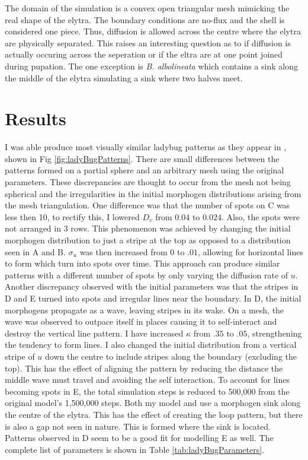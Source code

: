 The domain of the simulation is a convex open triangular mesh mimicking the real shape of the elytra. The boundary conditions are no-flux and the shell is considered one piece. Thus, diffusion is allowed across the centre where the elytra are physically separated. This raises an interesting question as to if diffusion is actually occuring across the seperation or if the eltra are at one point joined during pupation. The one exception is \textit{B. albolineata} which contains a sink along the middle of the elytra simulating a sink where two halves meet.

\section{Results}
I was able produce most visually similar ladybug patterns as they appear in \citep{Liaw2001}, shown in Fig \ref{fig:ladyBugPatterns}. There are small differences between the patterns formed on a partial sphere and an arbitrary mesh using the original parameters. These discrepancies are thought to occur from the mesh not being spherical and the irregularities in the initial morphogen distributions arising from the mesh triangulation. One difference was that the number of spots on C was less then 10, to rectify this, I lowered $D_v$ from $0.04$ to $0.024$. Also, the spots were not arranged in 3 rows. This phenomenon was achieved by changing the initial morphogen distribution to just a stripe at the top as opposed to a distribution seen in A and B. $\sigma_u$ was then increased from $0$ to $.01$, allowing for horizontal lines to form which turn into spots over time. This approach can produce similar patterns  with a different number of spots by only varying the diffusion rate of $u$. Another discrepancy observed with the initial parameters was that the stripes in D and E turned into spots and irregular lines near the boundary. In D, the initial morphogens propagate as a wave, leaving stripes in its wake. On a mesh, the wave was observed to outpace itself in places causing it to self-interact and destroy the vertical line pattern. I have increased $\kappa$ from $.35$ to $.05$, strengthening the tendency to form lines. I also changed the initial distribution from a vertical stripe of $u$ down the centre to include stripes along the boundary (excluding the top). This has the effect of aligning the pattern by reducing the distance the middle wave must travel and avoiding the self interaction. To account for lines becoming spots in E, the total simulation steps is reduced to 500,000 from the original model's 1,500,000 steps. Both my model and \citep{Liaw2001} use a morphogen sink along the centre of the elytra. This has the effect of creating the loop pattern, but there is also a gap not seen in nature. This is formed where the sink is located. Patterns observed in D seem to be a good fit for modelling E as well. The complete list of parameters is shown in Table \ref{tab:ladyBugParameters}.

